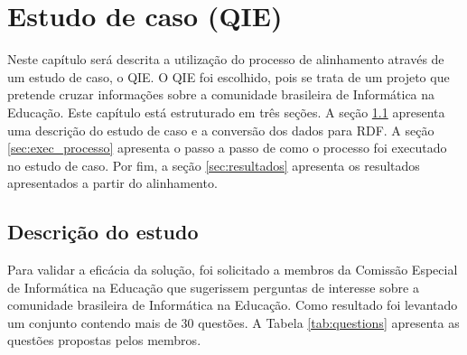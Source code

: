 \chapter{Estudo de caso (QIE)}
\label{cap:estudo}
Neste capítulo será descrita a utilização do processo de alinhamento através de um estudo de caso, o QIE. O QIE foi escolhido, pois se trata de um projeto que pretende cruzar informações sobre a comunidade brasileira de Informática na Educação. Este capítulo está estruturado em três seções. A seção \ref{sec:estudo_descricao} apresenta uma descrição do estudo de caso e a conversão dos dados para RDF. A seção \ref{sec:exec_processo} apresenta o passo a passo de como o processo foi executado no estudo de caso. Por fim, a seção \ref{sec:resultados} apresenta os resultados apresentados a partir do alinhamento.

\section{Descrição do estudo}
\label{sec:estudo_descricao}
Para validar a eficácia da solução, foi solicitado a membros da Comissão Especial de Informática na Educação que sugerissem perguntas de interesse sobre a comunidade brasileira de Informática na Educação. Como resultado foi levantado um conjunto contendo mais de 30 questões. A Tabela \ref{tab:questions} apresenta as questões propostas pelos membros.

